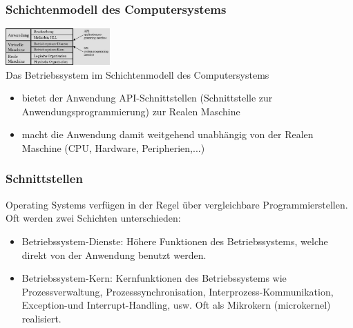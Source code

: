 \subsubsection{Schichtenmodell des Computersystems}
\includegraphics[width=0.3\textwidth]{images/Betriebssysteme/Schichtenmodell.png}\\
Das Betriebssystem im Schichtenmodell des Computersystems
\begin{itemize}
    \item bietet der Anwendung API-Schnittstellen (Schnittstelle zur Anwendungsprogrammierung) zur Realen Maschine
    \item macht die Anwendung damit weitgehend unabhängig von der Realen Maschine (CPU, Hardware, Peripherien,...)
\end{itemize}

\subsubsection{Schnittstellen}
Operating Systems verfügen in der Regel über vergleichbare Programmierstellen.
Oft werden zwei Schichten unterschieden:
\begin{itemize}
    \item Betriebssystem-Dienste: Höhere Funktionen des Betriebssystems, welche direkt von der Anwendung benutzt werden.
    \item Betriebssystem-Kern: Kernfunktionen des Betriebssystems wie Prozessverwaltung, Prozesssynchronisation, Interprozess-Kommunikation, Exception-und Interrupt-Handling, usw. Oft als Mikrokern (microkernel) realisiert.
\end{itemize}

